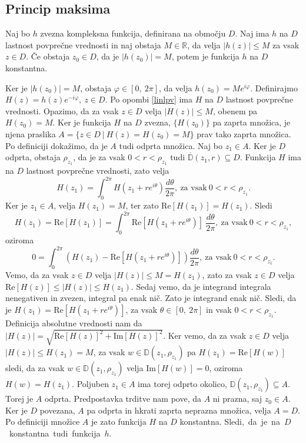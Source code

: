 \documentclass[mat1, tisk]{fmfdelo}
\begin{document}
\subsection{Princip maksima}
    \begin{trditev}
        \label{pm_lpv}
        Naj bo $h$ zvezna kompleksna funkcija, definirana na območju $D$. Naj ima $h$ na $D$ lastnost povprečne vrednosti in naj obstaja $M \in \mathbb{R}$, da velja $|h(z)| \leq M$ za vsak $z \in D$. 
        Če obstaja $z_0 \in D$, da je $|h(z_0)| = M$, potem je funkcija $h$ na $D$ konstantna. 
    \end{trditev}
    \begin{dokaz}
        Ker je $|h(z_0)| = M$, obstaja $\varphi \in [0,~2\pi]$, da velja \mbox{$h(z_0) = M e^{i \varphi}$}.
        Definirajmo $H(z) = h(z) e^{-i\varphi},~z \in D$. Po opombi \ref{linlpv} ima $H$ na $D$ lastnost povprečne vrednosti. Opazimo, da za vsak $z \in D$ velja $|H(z)|  \leq M$, obenem pa \mbox{$H(z_0) = M$}.
        Ker je funkcija $H$ na $D$ zvezna, $\{H(z_0)\}$ pa zaprta množica, je njena praslika \mbox{$A = \{z \in D~|~H(z) = H(z_0) = M\}$} prav tako zaprta množica. Po definiciji dokažimo, da je $A$ tudi odprta množica. 
        Naj bo $z_1 \in A$. Ker je $D$ odprta, obstaja $\rho_{z_1}$, da je za vsak $0 < r < \rho_{z_1}$ tudi $\overline{\mathbb{D}}(z_1, r) \subseteq D$. 
        Funkcija $H$ ima na $D$ lastnost povprečne vrednosti, zato velja
        $$
            H(z_1) = \int_{0}^{2\pi}{H(z_1 + re^{i\theta}) \frac{d\theta}{2\pi}},~\text{za vsak}~0<r<\rho_{z_1}.
        $$
        Ker je $z_1 \in A$, velja $H(z_1) = M$, ter zato $\text{Re}[H(z_1)] = H(z_1)$. 
        Sledi
        $$
        H(z_1) = \text{Re}[H(z_1)] = \int_{0}^{2\pi}{\text{Re}[H(z_1 + re^{i\theta})]~\frac{d\theta}{2\pi}},~\text{za vsak}~0<r<\rho_{z_1},
        $$
        oziroma
        $$
        0 = \int_{0}^{2\pi}{\left(H(z_1) - \text{Re}[H(z_1 + re^{i\theta})] \right)\frac{d\theta}{2\pi}},~\text{za vsak}~0<r<\rho_{z_1}.
        $$
        Vemo, da za vsak $z \in D$ velja $|H(z)| \leq M = H(z_1)$, zato za vsak $z \in D$ velja $\text{Re}[H(z)] \leq |H(z)| \leq H(z_1)$.
        Sedaj vemo, da je integrand integrala nenegativen in zvezen, integral pa enak nič. Zato je integrand enak nič. 
        Sledi, da je \mbox{$H(z_1) = \text{Re}[H(z_1 + r e^{i \theta})]$}, za vsak $\theta \in [0,~2\pi]$ in vsak $0 < r < \rho_{z_1}$. Definicija absolutne vrednosti nam da $|H(z)| = \sqrt{\text{Re}[H(z)]^2 + \text{Im}[H(z)]^2}$. 
        Ker vemo, da za vsak $z \in D$ velja $|H(z)| \leq H(z_1) = M$, za vsak $w \in \mathbb{D}(z_1,\rho_{z_1})$ pa $H(z_1) = \text{Re}[H(w)]$ sledi, da za vsak $w \in \mathbb{D}(z_1,\rho_{z_1})$ velja $\text{Im}[H(w)] = 0$, oziroma $H(w) = H(z_1)$. 
        Poljuben $z_1 \in A$ ima torej odprto okolico, $ \mathbb{D}(z_1, \rho_{z_1}) \subseteq A$. Torej je $A$ odprta.
        Predpostavka trditve nam pove, da $A$ ni prazna, saj $z_0 \in A$. Ker je $D$ povezana, $A$ pa odprta in hkrati zaprta neprazna množica, velja $A = D$. 
        Po definiciji množice $A$ je zato funkcija $H$ na $D$ konstantna. \mbox{Sledi, da je na $D$ konstantna tudi funkcija $h$.} 
    \end{dokaz}
\end{document}
